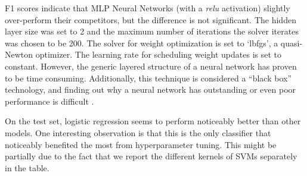 F1 scores indicate that MLP Neural Networks (with a \textit{relu} activation) slightly over-perform their competitors, but the difference is not significant. The hidden layer size was set to 2 and the maximum number of iterations the solver iterates was chosen to be 200. The solver for weight optimization is set to `lbfgs', a quasi-Newton optimizer. The learning rate for scheduling weight updates is set to constant. However, the generic layered structure of a neural network has proven to be time consuming. Additionally, this technique is considered a ``black box'' technology, and finding out why a neural network has outstanding or even poor performance is  difficult \cite{noriega2005multilayer}.

On the test set, logistic regression seems to perform  noticeably better than other models. One interesting observation is that this is the only classifier that noticeably benefited the most from hyperparameter tuning. This might be partially due to the fact that we report the different kernels of SVMs separately in the table.

\begin{table}[ht]
\caption{Model performance comparing validation and test sets}
\label{results}
\centering
\setlength{\tabcolsep}{3pt}
\end{table}

